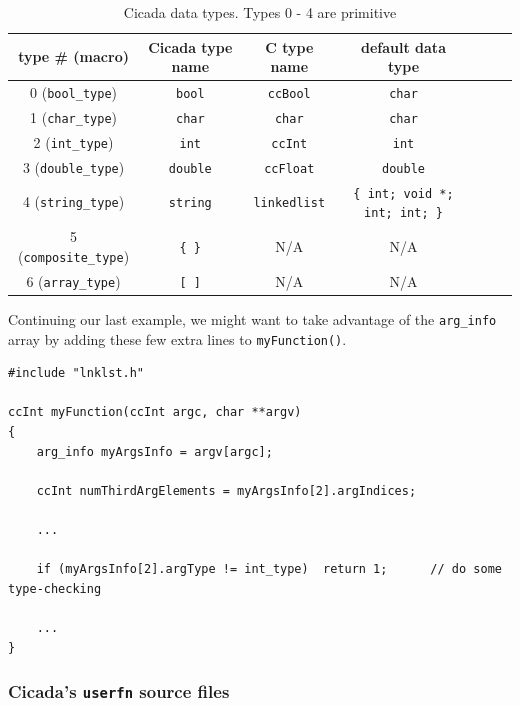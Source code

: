\documentclass{article}
\newenvironment{code}{
       \begin{list}{}{
               \setlength{\leftmargin}{.4in}
               \setlength{\rightmargin}{0in}
               \setlength{\topsep}{.2in}
       }
       \small
       \item[] }
       { \end{list}   }
\begin{document}
\begin{table}
\begin{center}
\begin{tabular}{|c|c|c|c|c|c|c|}
\hline
type \# (macro) & Cicada type name & C type name & default data type\\
\hline
0 (\verb#bool_type#) & \verb#bool# & \verb#ccBool# & \verb#char#\index{bool@\texttt{bool}}\\
1 (\verb#char_type#) & \verb#char# & \verb#char# & \verb#char#\index{char@\texttt{char}}\\
2 (\verb#int_type#) & \verb#int# & \verb#ccInt# & \verb#int#\index{int@\texttt{int}}\\
3 (\verb#double_type#) & \verb#double# & \verb#ccFloat# & \verb#double#\index{double@\texttt{double}}\\
\hline
4 (\verb#string_type#) & \verb#string# & \verb#linkedlist# & \verb#{ int; void *; int; int; }#\index{linkedlist@\texttt{linkedlist}}\\
\hline
5 (\verb#composite_type#) & \verb#{ }# & N/A & N/A\\
6 (\verb#array_type#) & \verb#[ ]# & N/A & N/A\\
\hline
\end{tabular}
\caption{Cicada data types.  Types 0 - 4 are primitive} 
\label{types_table}
\end{center}
\end{table}

Continuing our last example, we might want to take advantage of the \verb#arg_info# array by adding these few extra lines to \verb#myFunction()#.

\begin{code} \begin{verbatim}
#include "lnklst.h"

ccInt myFunction(ccInt argc, char **argv)
{
    arg_info myArgsInfo = argv[argc];
    
    ccInt numThirdArgElements = myArgsInfo[2].argIndices;
    
    ...
    
    if (myArgsInfo[2].argType != int_type)  return 1;      // do some type-checking
    
    ...
}
\end{verbatim} \end{code}




\subsubsection{Cicada's \texttt{userfn} source files}
\end{document}
